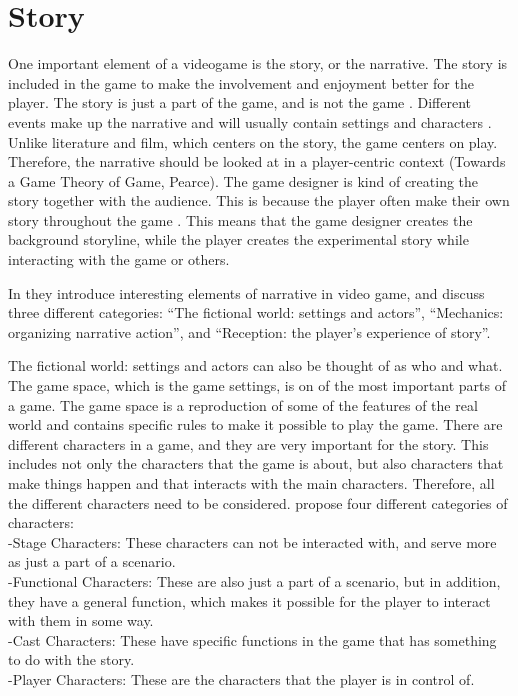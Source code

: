 \section{Story}
One important element of a videogame is the story, or the narrative. The story is included in the game to make the involvement and enjoyment better for the player. The story is just a part of the game, and is not the game \cite{umlapproach}.  Different events make up the narrative and will usually contain settings and characters \cite{understandingvg}. Unlike literature and film, which centers on the story, the game centers on play. Therefore, the narrative should be looked at in a player-centric context (Towards a Game Theory of Game, Pearce). The game designer is kind of creating the story together with the audience. This is because the player often make their own story throughout the game \cite{umlapproach}. This means that the game designer creates the background storyline, while the player creates the experimental story while interacting with the game or others. 

In \cite{understandingvg} they introduce interesting elements of narrative in video game, and discuss three different categories: “The fictional world: settings and actors”, “Mechanics: organizing narrative action”, and “Reception: the player’s experience of story”.

The fictional world: settings and actors can also be thought of as who and what. The game space, which is the game settings, is on of the most important parts of a game. The game space is a reproduction of some of the features of the real world and contains specific rules to make it possible to play the game. There are different characters in a game, and they are very important for the story. This includes not only the characters that the game is about, but also characters that make things happen and that interacts with the main characters. Therefore, all the different characters need to be considered. \cite{understandingvg} propose four different categories of characters: \\
-Stage Characters: These characters can not be interacted with, and serve more as just a part of a scenario. \\
-Functional Characters: These are also just a part of a scenario, but in addition, they have a general function, which makes it possible for the player to interact with them in some way. \\
-Cast Characters: These have specific functions in the game that has something to do with the story. \\
-Player Characters: These are the characters that the player is in control of. 

